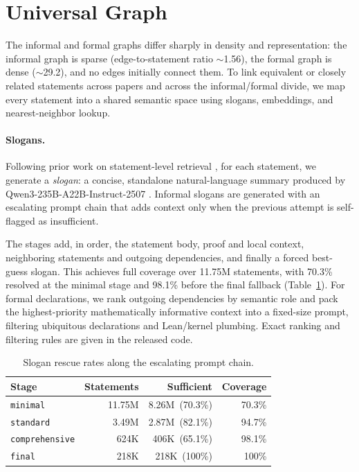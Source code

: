 \section{Universal Graph}
\label{sec:universal-graph}

The informal and formal graphs differ sharply in density and representation: the informal graph is sparse (edge-to-statement ratio $\sim$1.56), the formal graph is dense ($\sim$29.2), and no edges initially connect them. To link equivalent or closely related statements across papers and across the informal/formal divide, we map every statement into a shared semantic space using slogans, embeddings, and nearest-neighbor lookup.

\paragraph{Slogans.} Following prior work on statement-level retrieval \cite{leansearch-v1, theoremsearch2026}, for each statement, we generate a \emph{slogan}: a concise, standalone natural-language summary produced by Qwen3-235B-A22B-Instruct-2507 \cite{qwen3technicalreport}. Informal slogans are generated with an escalating prompt chain that adds context only when the previous attempt is self-flagged as insufficient. 

The stages add, in order, the statement body, proof and local context, neighboring statements and outgoing dependencies, and finally a forced best-guess slogan. This achieves full coverage over 11.75M statements, with 70.3\% resolved at the minimal stage and 98.1\% before the final fallback (Table~\ref{tab:slogan-chain}). For formal declarations, we rank outgoing dependencies by semantic role and pack the highest-priority mathematically informative context into a fixed-size prompt, filtering ubiquitous declarations and Lean/kernel plumbing. Exact ranking and filtering rules are given in the released code.

\begin{table}[h]
  \centering
  \setlength{\tabcolsep}{4pt}
  \small
  \begin{tabular}{lrrr}
    \toprule
    \textbf{Stage} & \textbf{Statements} & \textbf{Sufficient} & \textbf{Coverage} \\
    \midrule
    \texttt{minimal}       & 11.75M & 8.26M\ (70.3\%) & 70.3\% \\
    \texttt{standard}      & 3.49M  & 2.87M\ (82.1\%) & 94.7\% \\
    \texttt{comprehensive} & 624K   & 406K\ (65.1\%)  & 98.1\% \\
    \texttt{final}         & 218K   & 218K\ (100\%)   & 100\% \\
    \bottomrule
  \end{tabular}
  \caption{Slogan rescue rates along the escalating prompt chain.}
  \label{tab:slogan-chain}
\end{table}

